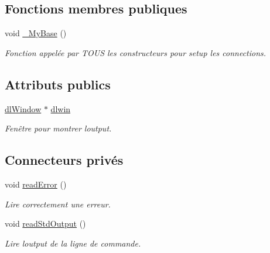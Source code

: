 \subsection*{Fonctions membres publiques}
\begin{DoxyCompactItemize}
\item 
\mbox{\label{classkProcess_a1ebe96a8060872f44d9c1b7690c9abc1}} 
void \hyperlink{classkProcess_a1ebe96a8060872f44d9c1b7690c9abc1}{\+\_\+\+My\+Base} ()
\begin{DoxyCompactList}\small\item\em Fonction appelée par T\+O\+US les constructeurs pour setup les connections. \end{DoxyCompactList}\end{DoxyCompactItemize}
\subsection*{Attributs publics}
\begin{DoxyCompactItemize}
\item 
\mbox{\label{classkProcess_a7971346eea08a760a98ab2049ca8ed9a}} 
\hyperlink{classdlWindow}{dl\+Window} $\ast$ \hyperlink{classkProcess_a7971346eea08a760a98ab2049ca8ed9a}{dlwin}
\begin{DoxyCompactList}\small\item\em Fenêtre pour montrer l\textquotesingle{}output. \end{DoxyCompactList}\end{DoxyCompactItemize}
\subsection*{Connecteurs privés}
\begin{DoxyCompactItemize}
\item 
\mbox{\label{classkProcess_a986998c6e21642024017511cc1dd862e}} 
void \hyperlink{classkProcess_a986998c6e21642024017511cc1dd862e}{read\+Error} ()
\begin{DoxyCompactList}\small\item\em Lire correctement une erreur. \end{DoxyCompactList}\item 
\mbox{\label{classkProcess_a922dfb6bad1ed7c25d24db374ad63326}} 
void \hyperlink{classkProcess_a922dfb6bad1ed7c25d24db374ad63326}{read\+Std\+Output} ()
\begin{DoxyCompactList}\small\item\em Lire l\textquotesingle{}output de la ligne de commande. \end{DoxyCompactList}\end{DoxyCompactItemize}


